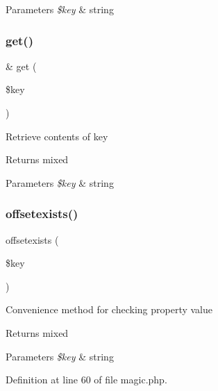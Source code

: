 \begin{DoxyParams}{Parameters}
{\em \$key} & string \\
\hline
\end{DoxyParams}
\hypertarget{class_magic_ac3695923790b06917410e205068b8376}{}\label{class_magic_ac3695923790b06917410e205068b8376} 
\subsubsection{\texorpdfstring{get()}{get()}}
{\footnotesize\ttfamily \& get (\begin{DoxyParamCaption}\item[{}]{\$key }\end{DoxyParamCaption})\hspace{0.3cm}{\ttfamily [abstract]}}

Retrieve contents of key \begin{DoxyReturn}{Returns}
mixed 
\end{DoxyReturn}

\begin{DoxyParams}{Parameters}
{\em \$key} & string \\
\hline
\end{DoxyParams}
\hypertarget{class_magic_a16da5af940f99a0df550a7f7c7c5d4e4}{}\label{class_magic_a16da5af940f99a0df550a7f7c7c5d4e4} 
\subsubsection{\texorpdfstring{offsetexists()}{offsetexists()}}
{\footnotesize\ttfamily offsetexists (\begin{DoxyParamCaption}\item[{}]{\$key }\end{DoxyParamCaption})}

Convenience method for checking property value \begin{DoxyReturn}{Returns}
mixed 
\end{DoxyReturn}

\begin{DoxyParams}{Parameters}
{\em \$key} & string \\
\hline
\end{DoxyParams}


Definition at line 60 of file magic.\+php.

\hypertarget{class_magic_a4736f7355697c49bcd06b643b4077e8a}{}\label{class_magic_a4736f7355697c49bcd06b643b4077e8a} 

